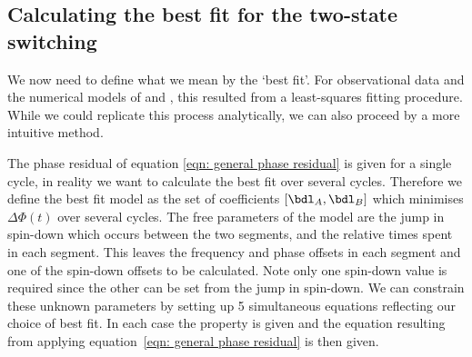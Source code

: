 \documentclass[/home/greg/Thesis/main/main.tex]{subfiles}
\begin{document}
\FloatBarrier
\subsection{Calculating the best fit for the two-state switching}
We now need to define what we mean by the `best fit'. For observational data
and the numerical models of \citet{Lyne2010} and \citet{Perrera2014}, this
resulted from a least-squares fitting procedure. While we could replicate
this process analytically, we can also proceed by a more intuitive method. 

The
phase residual of equation \eqref{eqn: general phase residual} is given for a 
single cycle, in reality we want to calculate the best fit over several cycles.
Therefore we define the best fit model as the set of coefficients $[\bdl_{A}, \bdl_{B}]$
which minimises $\Delta\Phi(t)$ over several cycles. The free parameters of the
model are the jump in spin-down which occurs between the two segments, and the
relative times spent in each segment. This leaves the frequency and phase
offsets in each segment and one of the spin-down offsets to be calculated. Note
only one spin-down value is required since the other can be set from the jump
in spin-down. We can constrain these unknown parameters by setting up 
5 simultaneous
equations reflecting our choice of best fit.
In each case the property is given and the
equation resulting from applying equation~\eqref{eqn: general phase residual}
is then given.
\end{document}
